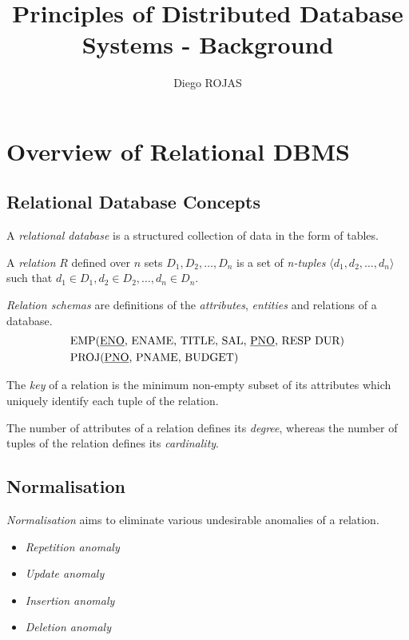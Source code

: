 \documentclass[12pt]{article}
\title{Principles of Distributed Database Systems - Background}
\author{Diego ROJAS}
\begin{document}
\maketitle

\section{Overview of Relational DBMS}

\subsection{Relational Database Concepts}

A \textit{relational database} is a structured collection of data in the form of tables.

A \textit{relation} $R$ defined over $n$ sets $D_1, D_2, \dots, D_n$ is a set of \textit{n-tuples} $\langle d_1, d_2, \dots, d_n \rangle$ such that $d_1 \in D_1, d_2 \in D_2, \dots, d_n \in D_n$.

\textit{Relation schemas} are definitions of the \textit{attributes}, \textit{entities} and relations of a database.
%
\begin{equation}
\begin{aligned}
	& \text{EMP(\underline{ENO}, ENAME, TITLE, SAL, \underline{PNO}, RESP DUR)} \\
	& \text{PROJ(\underline{PNO}, PNAME, BUDGET)}
\end{aligned}
\end{equation}

The \textit{key} of a relation is the minimum non-empty subset of its attributes which uniquely identify each tuple of the relation.

The number of attributes of a relation defines its \textit{degree}, whereas the number of tuples of the relation defines its \textit{cardinality}. 

\subsection{Normalisation}

\textit{Normalisation} aims to eliminate various undesirable anomalies of a relation.

\begin{itemize}
	\item \textit{Repetition anomaly}
	\item \textit{Update anomaly}
	\item \textit{Insertion anomaly}
	\item \textit{Deletion anomaly}
\end{itemize}
\end{document}
